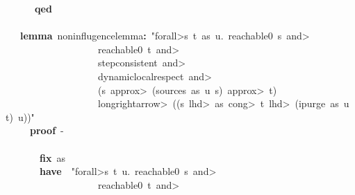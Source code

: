 \documentclass{article}
\newcommand{\syntaxKEYWORDA}[1]{\textcolor[rgb]{0.0,0.4,0.6}{\textbf{#1}}}
\newcommand{\syntaxKEYWORDC}[1]{\textcolor[rgb]{0.0,0.6,1.0}{\textbf{#1}}}
\newcommand{\syntaxLITERALA}[1]{\textcolor[rgb]{1.0,0.0,0.8}{#1}}
\newcommand{\syntaxOPERATOR}[1]{\textcolor[rgb]{0.0,0.0,0.0}{\textbf{#1}}}
\newcommand{\syntaxKEYWORDA}[1]{\textcolor[rgb]{0.0,0.4,0.6}{\textbf{#1}}}
\newcommand{\syntaxKEYWORDC}[1]{\textcolor[rgb]{0.0,0.6,1.0}{\textbf{#1}}}
\newcommand{\syntaxLITERALA}[1]{\textcolor[rgb]{1.0,0.0,0.8}{#1}}
\newcommand{\syntaxOPERATOR}[1]{\textcolor[rgb]{0.0,0.0,0.0}{\textbf{#1}}}
\newcommand{\syntaxKEYWORDA}[1]{\textcolor[rgb]{0.0,0.4,0.6}{\textbf{#1}}}
\newcommand{\syntaxKEYWORDC}[1]{\textcolor[rgb]{0.0,0.6,1.0}{\textbf{#1}}}
\newcommand{\syntaxLITERALA}[1]{\textcolor[rgb]{1.0,0.0,0.8}{#1}}
\newcommand{\syntaxOPERATOR}[1]{\textcolor[rgb]{0.0,0.0,0.0}{\textbf{#1}}}
\newcommand{\syntaxKEYWORDA}[1]{\textcolor[rgb]{0.0,0.4,0.6}{#1}}
\newcommand{\syntaxKEYWORDC}[1]{\textcolor[rgb]{0.0,0.6,1.0}{#1}}
\newcommand{\syntaxLITERALA}[1]{\textcolor[rgb]{1.0,0.0,0.8}{\textbf{#1}}}
\newcommand{\syntaxOPERATOR}[1]{\textcolor[rgb]{0.0,0.0,0.0}{#1}}
\newcommand{\syntaxKEYWORDA}[1]{\textcolor[rgb]{0.0,0.4,0.6}{\textbf{#1}}}
\newcommand{\syntaxKEYWORDC}[1]{\textcolor[rgb]{0.0,0.6,1.0}{\textbf{#1}}}
\newcommand{\syntaxLITERALA}[1]{\textcolor[rgb]{1.0,0.0,0.8}{#1}}
\newcommand{\syntaxOPERATOR}[1]{\textcolor[rgb]{0.0,0.0,0.0}{\textbf{#1}}}
\newcommand{\syntaxKEYWORDA}[1]{\textcolor[rgb]{0.0,0.4,0.6}{\textbf{#1}}}
\newcommand{\syntaxKEYWORDC}[1]{\textcolor[rgb]{0.0,0.6,1.0}{\textbf{#1}}}
\newcommand{\syntaxLITERALA}[1]{\textcolor[rgb]{1.0,0.0,0.8}{#1}}
\newcommand{\syntaxOPERATOR}[1]{\textcolor[rgb]{0.0,0.0,0.0}{\textbf{#1}}}
\begin{document}
{\ }{\ }{\ }{\ }{\ }{\ }{\ }\syntaxKEYWORDA{qed}\hspace*{\fill}\\
\hspace*{\fill}\\
{\ }{\ }{\ }{\ }\syntaxKEYWORDA{lemma}{\ }non\usebox{\underscorebox}influgence\usebox{\underscorebox}lemma\syntaxOPERATOR{:}{\ }\syntaxLITERALA{"\<forall>s{\ }t{\ }as{\ }u.{\ }reachable0{\ }s{\ }\<and>}\hspace*{\fill}\\
\syntaxLITERALA{{\ }{\ }{\ }{\ }{\ }{\ }{\ }{\ }{\ }{\ }{\ }{\ }{\ }{\ }{\ }{\ }{\ }{\ }{\ }{\ }reachable0{\ }t{\ }\<and>}\hspace*{\fill}\\
\syntaxLITERALA{{\ }{\ }{\ }{\ }{\ }{\ }{\ }{\ }{\ }{\ }{\ }{\ }{\ }{\ }{\ }{\ }{\ }{\ }{\ }{\ }step\usebox{\underscorebox}consistent{\ }\<and>}\hspace*{\fill}\\
\syntaxLITERALA{{\ }{\ }{\ }{\ }{\ }{\ }{\ }{\ }{\ }{\ }{\ }{\ }{\ }{\ }{\ }{\ }{\ }{\ }{\ }{\ }dynamic\usebox{\underscorebox}local\usebox{\underscorebox}respect{\ }\<and>}\hspace*{\fill}\\
\syntaxLITERALA{{\ }{\ }{\ }{\ }{\ }{\ }{\ }{\ }{\ }{\ }{\ }{\ }{\ }{\ }{\ }{\ }{\ }{\ }{\ }{\ }(s{\ }\<approx>{\ }(sources{\ }as{\ }u{\ }s){\ }\<approx>{\ }t)}\hspace*{\fill}\\
\syntaxLITERALA{{\ }{\ }{\ }{\ }{\ }{\ }{\ }{\ }{\ }{\ }{\ }{\ }{\ }{\ }{\ }{\ }{\ }{\ }{\ }{\ }\<longrightarrow>{\ }((s{\ }\<lhd>{\ }as{\ }\<cong>{\ }t{\ }\<lhd>{\ }(ipurge{\ }as{\ }u{\ }t){\ }\usebox{\atbox}{\ }u))"}\hspace*{\fill}\\
{\ }{\ }{\ }{\ }{\ }{\ }\syntaxKEYWORDA{proof}{\ }{-}\hspace*{\fill}\\
{\ }{\ }{\ }{\ }{\ }{\ }\syntaxKEYWORDA{\usebox{\opencurlybracket}}{\ }\hspace*{\fill}\\
{\ }{\ }{\ }{\ }{\ }{\ }{\ }{\ }\syntaxKEYWORDC{fix}{\ }as\hspace*{\fill}\\
{\ }{\ }{\ }{\ }{\ }{\ }{\ }{\ }\syntaxKEYWORDA{have}{\ }{\ }\syntaxLITERALA{"\<forall>s{\ }t{\ }u.{\ }reachable0{\ }s{\ }\<and>}\hspace*{\fill}\\
\syntaxLITERALA{{\ }{\ }{\ }{\ }{\ }{\ }{\ }{\ }{\ }{\ }{\ }{\ }{\ }{\ }{\ }{\ }{\ }{\ }{\ }{\ }reachable0{\ }t{\ }\<and>}\hspace*{\fill}\\
\end{document}
